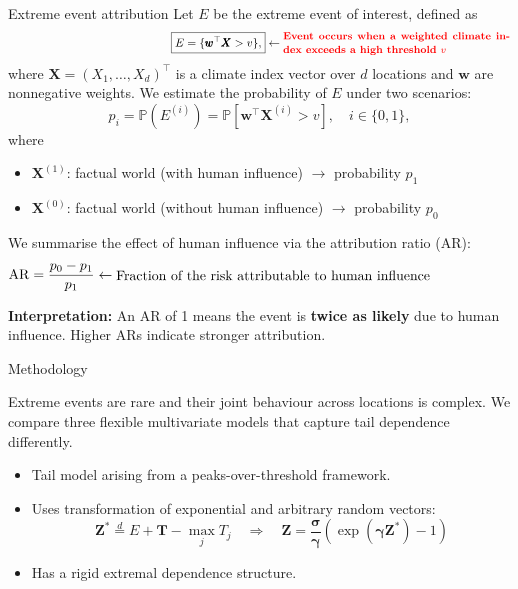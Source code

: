 \documentclass[final]{beamer}
\newlength{\colwidth}
\begin{document}
\begin{frame}[t]
\begin{columns}[t]
\begin{column}{\colwidth}
\begin{alertblock}{Extreme event attribution}
Let $E$ be the extreme event of interest, defined as 
$$\hspace{5cm}
\boxed{
E = \{ \pmb{w}^\top \pmb{X} > v \},
}\leftarrow
\parbox{7cm}{\textcolor{red}{\small \textbf{Event occurs when a weighted climate index exceeds a high threshold \(v\)}}}
$$
where \(\pmb{X} = (X_1, \ldots, X_d)^\top\) is a climate index vector over \(d\) locations and \(\pmb{w}\) are nonnegative weights.
We estimate the probability of $E$ under two scenarios:
\[
p_i =  \mathbb{P}(E^{(i)})= \mathbb{P}[\pmb{w}^\top \pmb{X}^{(i)} > v], \quad i \in \{0,1\},
\]
where 
\begin{itemize}
    \item $\pmb{X}^{(1)}$: factual world (with human influence) $\rightarrow$ probability \textcolor{blue!70!black}{\textbf{\( p_1 \)}}
    \item $\pmb{X}^{(0)}$: factual world (without human influence) $\rightarrow$ probability \textcolor{orange!90!black}{\textbf{\( p_0 \)}}
\end{itemize}
\vspace{0.5em}
We summarise the effect of human influence via the attribution ratio (AR): 
$$
\mathrm{AR} = \frac{p_0 - p_1}{p_1} 
\leftarrow
\parbox{10cm}{Fraction of the risk attributable to human influence}
$$
\colorbox{cyan!10}{%
  \parbox{0.97\linewidth}{
  \textbf{Interpretation:}  
  An AR of 1 means the event is \textbf{twice as likely} due to human influence.  
  Higher ARs indicate stronger attribution.
  }
}
  \end{alertblock}
\vspace{-.3cm}
 \begin{block}{Methodology}
\vspace{-.3cm}

\textcolor{black!80}{
Extreme events are rare and their joint behaviour across locations is complex. We compare three flexible multivariate models that capture tail dependence differently.
}
\vspace{-.3cm}
\vspace{-.3cm}
\begin{itemize}
  \item Tail model arising from a peaks-over-threshold framework.
  \item Uses transformation of exponential and arbitrary random vectors:
  \[
  \pmb{Z}^* \overset{d}{=} E+\pmb{T}-\max_j T_j
  \quad \Rightarrow \quad
  \pmb{Z} = \frac{\pmb{\sigma}}{\pmb{\gamma}} \left( \exp(\pmb{\gamma Z}^*) - 1 \right)
  \]
  \item Has a rigid extremal dependence structure.
\end{itemize}


\end{block}
\end{column}
\end{columns}
\end{frame}
\end{document}
